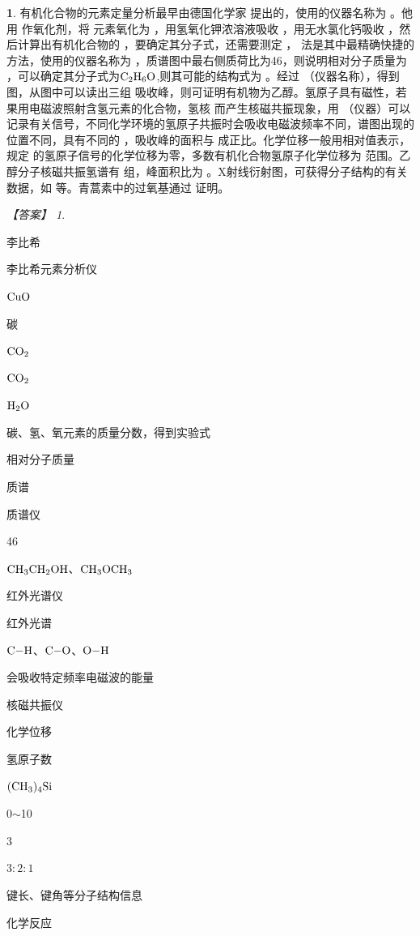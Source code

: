 \documentclass[UTF8, 10pt, a4paper, oneside]{ctexart}
\newcommand{\blank}{ \underbar{\quad$\blacktriangle$\quad} }%
\theoremstyle{definition}
\newtheorem{subexercise}{}[exercise]%
\theoremstyle{remark}
\newtheorem*{answer}{【答案】}
\theoremstyle{plain}
\begin{document}
\setcounter{subexercise}{0}
\addtocounter{exercise}{1}
\begin{subexercise}
    有机化合物的元素定量分析最早由德国化学家\blank 提出的，使用的仪器名称为\blank 。他用\blank 作氧化剂，将\blank 元素氧化为\blank ，用氢氧化钾浓溶液吸收\blank ，用无水氯化钙吸收\blank ，然后计算出有机化合物的\blank ，要确定其分子式，还需要测定\blank ，\blank 法是其中最精确快捷的方法，使用的仪器名称为\blank ，质谱图中最右侧质荷比为46，则说明相对分子质量为\blank ，可以确定其分子式为$\ce{C2H6O}$,则其可能的结构式为\blank 。经过\blank （仪器名称），得到\blank 图，从图中可以读出三组\blank 吸收峰，则可证明有机物为乙醇。氢原子具有磁性，若果用电磁波照射含氢元素的化合物，氢核\blank 而产生核磁共振现象，用\blank （仪器）可以记录有关信号，不同化学环境的氢原子共振时会吸收电磁波频率不同，谱图出现的位置不同，具有不同的\blank ，吸收峰的面积与\blank 成正比。化学位移一般用相对值表示，规定\blank 的氢原子信号的化学位移为零，多数有机化合物氢原子化学位移为\blank 范围。乙醇分子核磁共振氢谱有\blank 组，峰面积比为\blank 。X射线衍射图，可获得分子结构的有关数据，如\blank 等。青蒿素中的过氧基通过\blank 证明。
    \begin{answer}
        \begin{inparaenum}
            \item[\setcounter{enumi}{1}\textsuperscript{\arabic{enumi}}] 李比希
            \item 李比希元素分析仪
            \item $\ce{CuO}$
            \item 碳
            \item $\ce{CO2}$
            \item $\ce{CO2}$
            \item $\ce{H2O}$
            \item 碳、氢、氧元素的质量分数，得到实验式
            \item 相对分子质量
            \item 质谱
            \item 质谱仪
            \item 46
            \item $\ce{CH3CH2OH}$、$\ce{CH3OCH3}$
            \item 红外光谱仪
            \item 红外光谱
            \item $\ce{C-H}$、$\ce{C-O}$、$\ce{O-H}$
            \item 会吸收特定频率电磁波的能量
            \item 核磁共振仪
            \item 化学位移
            \item 氢原子数
            \item $\ce{(CH3)4Si}$
            \item 0$\sim$10
            \item 3
            \item $3:2:1$
            \item 键长、键角等分子结构信息
            \item 化学反应
        \end{inparaenum}
    \end{answer}
\end{subexercise}
\end{document}
